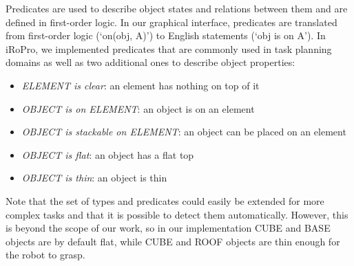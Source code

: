 Predicates are used to describe object states and relations between them and are defined in first-order logic.
In our graphical interface, predicates are translated from first-order logic (`on(obj, A)') to English statements (`obj is on A').
In iRoPro, we implemented predicates that are commonly used in task planning domains as well as two additional ones to describe object properties:
\begin{itemize}
    \item \textit{ELEMENT is clear}: an element has nothing on top of it
    \item \textit{OBJECT is on ELEMENT}: an object is on an element
    \item \textit{OBJECT is stackable on ELEMENT}: an object can be placed on an element
    \item \textit{OBJECT is flat}: an object has a flat top
    \item \textit{OBJECT is thin}: an object is thin
\end{itemize}
Note that the set of types and predicates could easily be extended for more complex tasks and that it is possible to detect them automatically.
However, this is beyond the scope of our work, so in our implementation CUBE and BASE objects are by default flat, while CUBE and ROOF objects are thin enough for the robot to grasp.


